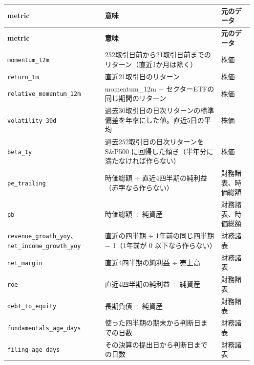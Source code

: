 \documentclass[xelatex,ja=standard,jafont=hiragino-pron,a4paper,10pt]{bxjsreport}
\begin{document}
{\footnotesize
\begin{longtable}{p{4.60cm}p{6.60cm}p{3.10cm}}
\toprule
\textbf{metric} & \textbf{意味} & \textbf{元のデータ} \\
\midrule
\endfirsthead
\toprule
\textbf{metric} & \textbf{意味} & \textbf{元のデータ} \\
\midrule
\endhead
\bottomrule
\endfoot
\texttt{momentum\_\allowbreak{}12m} & 252取引日前から21取引日前までのリターン（直近1か月は除く） & 株価 \\
\texttt{return\_\allowbreak{}1m} & 直近21取引日のリターン & 株価 \\
\texttt{relative\_\allowbreak{}momentum\_\allowbreak{}12m} & momentum\_12m − セクターETFの同じ期間のリターン & 株価 \\
\texttt{volatility\_\allowbreak{}30d} & 過去30取引日の日次リターンの標準偏差を年率にした値。直近5日の平均 & 株価 \\
\texttt{beta\_\allowbreak{}1y} & 過去252取引日の日次リターンを S\&P500 に回帰した傾き（半年分に満たなければ作らない） & 株価 \\
\texttt{pe\_\allowbreak{}trailing} & 時価総額 ÷ 直近4四半期の純利益（赤字なら作らない） & 財務諸表、時価総額 \\
\texttt{pb} & 時価総額 ÷ 純資産 & 財務諸表、時価総額 \\
\texttt{revenue\_\allowbreak{}growth\_\allowbreak{}yoy}、\texttt{net\_\allowbreak{}income\_\allowbreak{}growth\_\allowbreak{}yoy} & 直近の四半期 ÷ 1年前の同じ四半期 − 1（1年前が 0 以下なら作らない） & 財務諸表 \\
\texttt{net\_\allowbreak{}margin} & 直近4四半期の純利益 ÷ 売上高 & 財務諸表 \\
\texttt{roe} & 直近4四半期の純利益 ÷ 純資産 & 財務諸表 \\
\texttt{debt\_\allowbreak{}to\_\allowbreak{}equity} & 長期負債 ÷ 純資産 & 財務諸表 \\
\texttt{fundamentals\_\allowbreak{}age\_\allowbreak{}days} & 使った四半期の期末から判断日までの日数 & 財務諸表 \\
\texttt{filing\_\allowbreak{}age\_\allowbreak{}days} & その決算の提出日から判断日までの日数 & 財務諸表 \\
\end{longtable}
}
\end{document}

